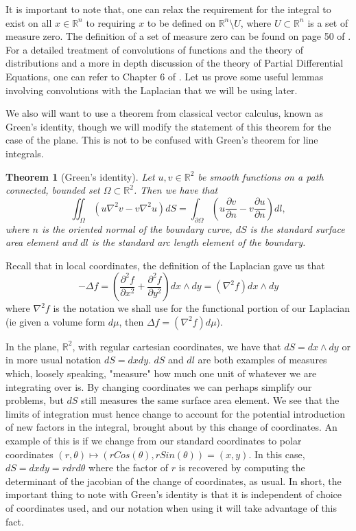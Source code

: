 \documentclass[11pt]{report}
\newtheorem{thm}{Theorem}[section]
\theoremstyle{definition}
\begin{document}
It is important to note that, one can relax the requirement for the integral to exist on all $x \in \mathbb{R}^n$ to requiring $x$ to be defined on $\mathbb{R}^n\setminus{U}$, where $U \subset \mathbb{R}^n$ is a set of measure zero. The definition of a set of measure zero can be found on page 50 of \cite{spivak}.
For a detailed treatment of convolutions of functions and the theory of distributions and a more in depth discussion of the theory of Partial Differential Equations, one can refer to Chapter 6 of \cite{rudin}.  
Let us prove some useful lemmas involving convolutions with the Laplacian that we will be using later. 

We also will want to use a theorem from classical vector calculus, known as Green's identity, though we will modify the statement of this theorem for the case of the plane. This is not to be confused with Green's theorem for line integrals.
\begin{thm}[Green's identity]
  Let $u,v \in \mathbb{R}^2$ be smooth functions on a path connected, bounded set $\Omega \subset \mathbb{R}^2$. Then we have that  
  \[\iint_{\Omega} (u \nabla^2 v - v \nabla^2 u) dS= \int_{\partial \Omega} \left(u \frac{\partial v}{\partial n} - v \frac{\partial u}{\partial n}\right) dl, \] 
  where $n$ is the oriented normal of the boundary curve, $dS$ is the standard surface area element and $dl$ is the standard arc length element of the boundary.
\end{thm}
Recall that in local coordinates, the definition of the Laplacian gave us that \[-\Delta f = (\frac{\partial^2 f}{\partial x^2} + \frac{\partial^2 f}{\partial y^2}) dx\wedge dy = (\nabla^2f) dx\wedge dy\]
where $\nabla^2f$ is the notation we shall use for the functional portion of our Laplacian (ie given a volume form $d\mu$, then $\Delta f = (\nabla^2 f) d\mu$).

In the plane, $\mathbb{R}^2$, with regular cartesian coordinates, we have that $dS = dx \wedge dy$ or in more usual notation $dS = dxdy$. $dS$ and $dl$ are both examples of measures which, loosely speaking, "measure" how much one unit of whatever we are integrating over is.
By changing coordinates we can perhaps simplify our problems, but $dS$ still measures the same surface area element. We see that the limits of integration must hence change to account for the potential introduction of new factors in the integral, brought about by this change of coordinates. An example of this is if we change from our standard coordinates to polar coordinates $(r,\theta) \mapsto (rCos(\theta),rSin(\theta)) = (x,y)$. In this case, $dS=dxdy=rdrd\theta$ where the factor of $r$ is recovered by computing the determinant of the jacobian of the change of coordinates, as usual. In short, the important thing to note with Green's identity is that it is independent of choice of coordinates used, and our notation when using it will take advantage of this fact.
\end{document}
